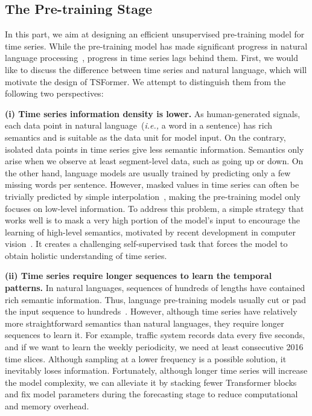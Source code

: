 \documentclass[sigconf]{acmart}
\newcommand{\ie}{\textit{i.e.,}\xspace}
\begin{document}
\vspace{-0.1cm}
\subsection{The Pre-training Stage}
In this part, we aim at designing an efficient unsupervised pre-training model for time series.
While the pre-training model has made significant progress in natural language processing~\cite{2019BERT, 2020GPT, 2018ELMO}, progress in time series lags behind them.
First, we would like to discuss the difference between time series and natural language, which will motivate the design of TSFormer.
We attempt to distinguish them from the following two perspectives:

\textbf{(i) Time series information density is lower.} 
As human-generated signals, each data point in natural language~(\ie a word in a sentence) has rich semantics and is suitable as the data unit for model input.
On the contrary, isolated 
{\fontsize{8.8pt}{\baselineskip}\selectfont 
data points in time series} give less semantic information. 
Semantics only arise when we observe at least segment-level data, such as going up or down.
On the other hand, language models are usually trained by predicting only a few missing words per sentence.
However, masked values in time series can often be trivially predicted by simple interpolation~\cite{2021KDD_Transformer}, making the pre-training model only focuses on low-level information.
To address this problem, a simple strategy that works well is to mask a very high portion of the model's input to encourage the learning of high-level semantics, motivated by recent development in computer vision~\cite{2021MAE}. 
It creates a challenging self-supervised task that forces the model to obtain holistic understanding of time series.

\textbf{(ii) Time series require longer sequences to learn the temporal patterns.}
In natural languages, sequences of hundreds of lengths have contained rich semantic information.
Thus, language pre-training models usually cut or pad the input sequence to hundreds~\cite{2018ELMO, 2020GPT, 2019BERT}.
However, although time series have relatively more straightforward semantics than natural languages, they require longer sequences to learn it. For example, traffic system records data every five seconds, and if we want to learn the weekly periodicity, we need at least consecutive 2016 time slices. 
Although sampling at a lower frequency is a possible solution, it inevitably loses information.
Fortunately, although longer time series will increase the model complexity, we can alleviate it by stacking fewer Transformer blocks and fix model parameters during the forecasting stage to reduce computational and memory overhead.
\end{document}
